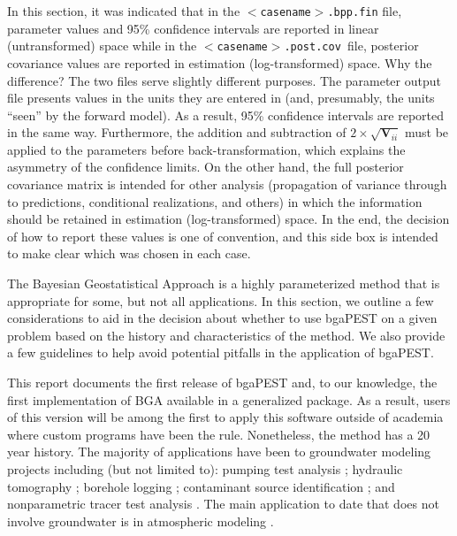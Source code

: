 \documentclass[11pt,oneside,onecolumn]{usgsreport}
\begin{document}
\begin{multicols}{2}
{\begin{minipage}[t]{0.9\columnwidth}
In this section, it was indicated that in the \texttt{$<$casename$>$.bpp.fin}
file, parameter values and 95\% confidence intervals are reported
in linear (untransformed) space while in the \texttt{$<$casename$>$.post.cov
}file, posterior covariance values are reported in estimation (log-transformed)
space. Why the difference? The two files  serve slightly different
purposes. The parameter output file presents values in the units they
are entered in (and, presumably, the units ``seen'' by the forward
model). As a result, 95\% confidence intervals are reported in the
same way. Furthermore, the addition and subtraction of $2\times\sqrt{\mathbf{V}_{ii}}$
must be applied to the parameters before back-transformation, which
explains the asymmetry of the confidence limits. On the other hand,
the full posterior covariance matrix is intended for other analysis
(propagation of variance through to predictions, conditional realizations,
and others) in which the information should be retained in estimation
(log-transformed) space. In the end, the decision of how to report
these values is one of convention, and this side box is intended to
make clear which was chosen in each case.%
\end{minipage}
}



The Bayesian Geostatistical Approach is a highly parameterized method
that is appropriate for some, but not all applications. In this section,
we outline a few considerations to aid in the decision about whether
to use bgaPEST on a given problem based on the history and characteristics
of the method. We also provide a few guidelines to help avoid potential
pitfalls in the application of bgaPEST.

This report documents the first release of bgaPEST and, to our knowledge,
the first implementation of BGA available in a generalized package.
As a result, users of this version will be among the first to apply
this software outside of academia where custom programs have been
the rule. Nonetheless, the method has a 20 year history. The majority
of applications have been to groundwater modeling projects including
(but not limited to): pumping test analysis \citep{SnodgrassPKK1998};
hydraulic tomography \citep{LiCirpka2007,FienenWRR2008,LiCirpka2008,CardiffPKK2009,cardiff2012};
borehole logging \citep{fienenEtal2004}; contaminant source identification
\citep{SnodgrassPKK1997,MichalakPKK2002a,MichalakPKK2003}; and nonparametric
tracer test analysis \citep{FienenWRR2006}. The main application
to date that does not involve groundwater is in atmospheric modeling
\citep{MIchalak2004,MuellerEtAl2008}. 



\end{multicols}
\end{document}
